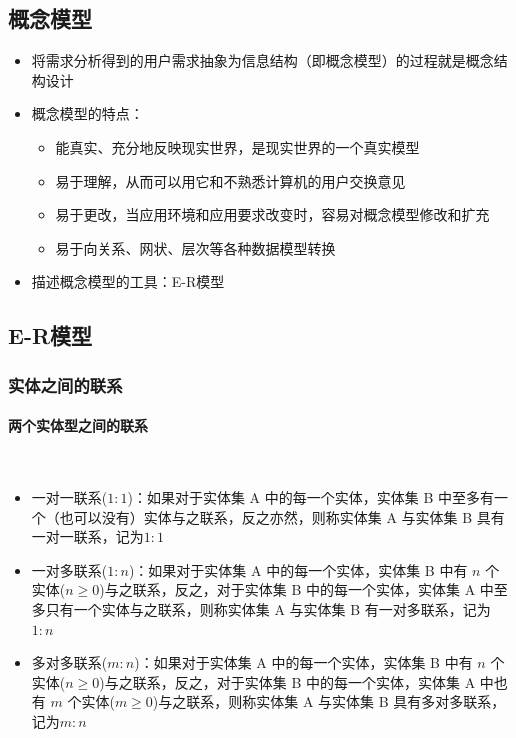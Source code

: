 \subsection{概念模型}
\begin{itemize}
    \item 将需求分析得到的用户需求抽象为信息结构（即概念模型）的过程就是概念结构设计
    \item 概念模型的特点：
    \begin{itemize}
        \item 能真实、充分地反映现实世界，是现实世界的一个真实模型
        \item 易于理解，从而可以用它和不熟悉计算机的用户交换意见
        \item 易于更改，当应用环境和应用要求改变时，容易对概念模型修改和扩充
        \item 易于向关系、网状、层次等各种数据模型转换
    \end{itemize}
    \item 描述概念模型的工具：E-R模型
\end{itemize}

\subsection{E-R模型}

\subsubsection{实体之间的联系}

\paragraph*{两个实体型之间的联系}~{}
\begin{itemize}
    \item 一对一联系($1:1$)：如果对于实体集 A 中的每一个实体，实体集 B 中至多有一个（也可以没有）实体与之联系，反之亦然，则称实体集 A 与实体集 B 具有一对一联系，记为$1:1$
    \item 一对多联系($1:n$)：如果对于实体集 A 中的每一个实体，实体集 B 中有 $n$ 个实体($n\geq 0$)与之联系，反之，对于实体集 B 中的每一个实体，实体集 A 中至多只有一个实体与之联系，则称实体集 A 与实体集 B 有一对多联系，记为$1:n$ 
    \item 多对多联系($m:n$)：如果对于实体集 A 中的每一个实体，实体集 B 中有 $n$ 个实体($n\geq 0$)与之联系，反之，对于实体集 B 中的每一个实体，实体集 A 中也有 $m$ 个实体($m\geq 0$)与之联系，则称实体集 A 与实体集 B 具有多对多联系，记为$m:n$
\end{itemize}

